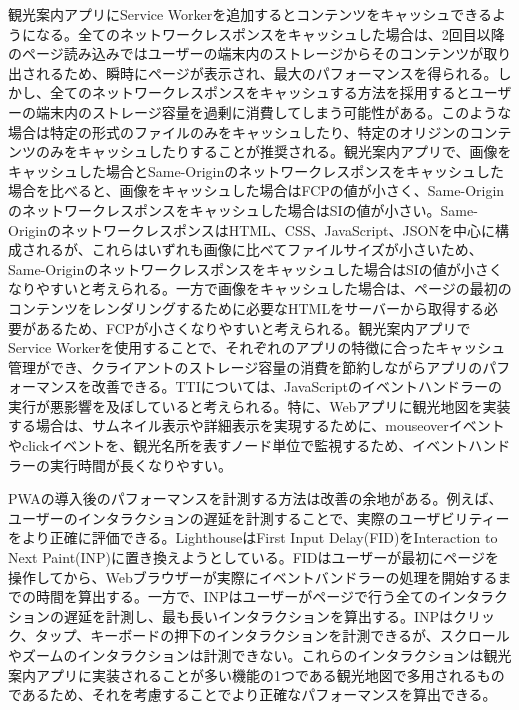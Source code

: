 観光案内アプリにService Workerを追加するとコンテンツをキャッシュできるようになる。全てのネットワークレスポンスをキャッシュした場合は、2回目以降のページ読み込みではユーザーの端末内のストレージからそのコンテンツが取り出されるため、瞬時にページが表示され、最大のパフォーマンスを得られる。しかし、全てのネットワークレスポンスをキャッシュする方法を採用するとユーザーの端末内のストレージ容量を過剰に消費してしまう可能性がある。このような場合は特定の形式のファイルのみをキャッシュしたり、特定のオリジンのコンテンツのみをキャッシュしたりすることが推奨される。観光案内アプリで、画像をキャッシュした場合とSame-Originのネットワークレスポンスをキャッシュした場合を比べると、画像をキャッシュした場合はFCPの値が小さく、Same-Originのネットワークレスポンスをキャッシュした場合はSIの値が小さい。Same-OriginのネットワークレスポンスはHTML、CSS、JavaScript、JSONを中心に構成されるが、これらはいずれも画像に比べてファイルサイズが小さいため、Same-Originのネットワークレスポンスをキャッシュした場合はSIの値が小さくなりやすいと考えられる。一方で画像をキャッシュした場合は、ページの最初のコンテンツをレンダリングするために必要なHTMLをサーバーから取得する必要があるため、FCPが小さくなりやすいと考えられる。観光案内アプリでService Workerを使用することで、それぞれのアプリの特徴に合ったキャッシュ管理ができ、クライアントのストレージ容量の消費を節約しながらアプリのパフォーマンスを改善できる。TTIについては、JavaScriptのイベントハンドラーの実行が悪影響を及ぼしていると考えられる。特に、Webアプリに観光地図を実装する場合は、サムネイル表示や詳細表示を実現するために、mouseoverイベントやclickイベントを、観光名所を表すノード単位で監視するため、イベントハンドラーの実行時間が長くなりやすい。

PWAの導入後のパフォーマンスを計測する方法は改善の余地がある。例えば、ユーザーのインタラクションの遅延を計測することで、実際のユーザビリティーをより正確に評価できる。LighthouseはFirst Input Delay(FID)をInteraction to Next Paint(INP)に置き換えようとしている。FIDはユーザーが最初にページを操作してから、Webブラウザーが実際にイベントバンドラーの処理を開始するまでの時間を算出する。一方で、INPはユーザーがページで行う全てのインタラクションの遅延を計測し、最も長いインタラクションを算出する。INPはクリック、タップ、キーボードの押下のインタラクションを計測できるが、スクロールやズームのインタラクションは計測できない。これらのインタラクションは観光案内アプリに実装されることが多い機能の1つである観光地図で多用されるものであるため、それを考慮することでより正確なパフォーマンスを算出できる。

